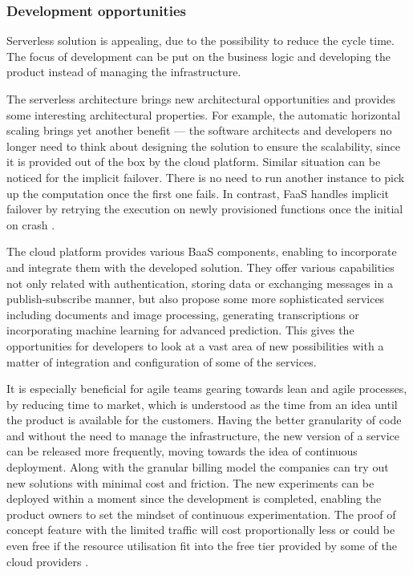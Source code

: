 \subsubsection*{Development opportunities}

Serverless solution is appealing, due to the possibility to reduce the cycle time. The focus of development can be put on the business logic and developing the product instead of managing the infrastructure.

The serverless architecture brings new architectural opportunities and provides some interesting architectural properties. For example, the automatic horizontal scaling brings yet another benefit --- the software architects and developers no longer need to think about designing the solution to ensure the scalability, since it is provided out of the box by the cloud platform. Similar situation can be noticed for the implicit failover. There is no need to run another instance to pick up the computation once the first one fails. In contrast, FaaS handles implicit failover by retrying the execution on newly provisioned functions once the initial on crash \cite{LeveragingServerlessCloudComputingArchitectures}.

The cloud platform provides various BaaS components, enabling to incorporate and integrate them with the developed solution. They offer various capabilities not only related with authentication, storing data or exchanging messages in a publish-subscribe manner, but also propose some more sophisticated services including documents and image processing, generating transcriptions or incorporating machine learning for advanced prediction. This gives the opportunities for developers to look at a vast area of new possibilities with a matter of integration and configuration of some of the services.

It is especially beneficial for agile teams gearing towards lean and agile processes, by reducing time to market, which is understood as the time from an idea until the product is available for the customers. Having the better granularity of code and without the need to manage the infrastructure, the new version of a service can be released more frequently, moving towards the idea of continuous deployment. Along with the granular billing model the companies can try out new solutions with minimal cost and friction. The new experiments can be deployed within a moment since the development is completed, enabling the product owners to set the mindset of continuous experimentation. The proof of concept feature with the limited traffic will cost proportionally less or could be even free if the resource utilisation fit into the free tier provided by some of the cloud providers \cite{MartinFowlerServerless}.

